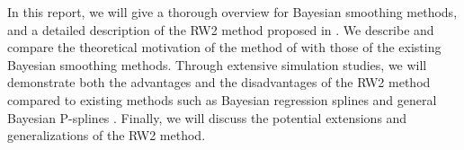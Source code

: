 \documentclass{article}
\begin{document}
In this report, we will give a thorough overview for Bayesian smoothing methods, and a detailed description of the RW2 method proposed in \cite{rw2}. We describe and compare the theoretical motivation of the method of \cite{rw2} with those of the existing Bayesian smoothing methods. Through extensive simulation studies, we will demonstrate both the advantages and the disadvantages of the RW2 method compared to existing methods such as Bayesian regression splines and general Bayesian P-splines \citep{bayesianPsplines}. Finally, we will discuss the potential extensions and generalizations of the RW2 method.


\newpage


\end{document}
